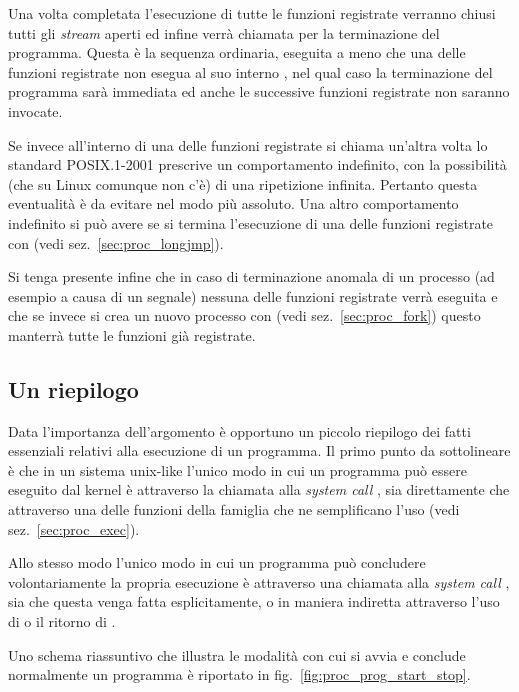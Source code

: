 Una volta completata l'esecuzione di tutte le funzioni registrate verranno
chiusi tutti gli \textit{stream} aperti ed infine verrà chiamata 
per la terminazione del programma. Questa è la sequenza ordinaria, eseguita a
meno che una delle funzioni registrate non esegua al suo interno
, nel qual caso la terminazione del programma sarà immediata ed
anche le successive funzioni registrate non saranno invocate.

Se invece all'interno di una delle funzioni registrate si chiama un'altra
volta  lo standard POSIX.1-2001 prescrive un comportamento
indefinito, con la possibilità (che su Linux comunque non c'è) di una
ripetizione infinita. Pertanto questa eventualità è da evitare nel modo più
assoluto. Una altro comportamento indefinito si può avere se si termina
l'esecuzione di una delle funzioni registrate con  (vedi
sez.~\ref{sec:proc_longjmp}).

Si tenga presente infine che in caso di terminazione anomala di un processo
(ad esempio a causa di un segnale) nessuna delle funzioni registrate verrà
eseguita e che se invece si crea un nuovo processo con  (vedi
sez.~\ref{sec:proc_fork}) questo manterrà tutte le funzioni già registrate.


\subsection{Un riepilogo}
\label{sec:proc_term_conclusion}

Data l'importanza dell'argomento è opportuno un piccolo riepilogo dei fatti
essenziali relativi alla esecuzione di un programma. Il primo punto da
sottolineare è che in un sistema unix-like l'unico modo in cui un programma
può essere eseguito dal kernel è attraverso la chiamata alla \textit{system
  call} , sia direttamente che attraverso una delle funzioni
della famiglia  che ne semplificano l'uso (vedi
sez.~\ref{sec:proc_exec}).

Allo stesso modo l'unico modo in cui un programma può concludere
volontariamente la propria esecuzione è attraverso una chiamata alla
\textit{system call} , sia che questa venga fatta esplicitamente,
o in maniera indiretta attraverso l'uso di  o il ritorno di
. 

Uno schema riassuntivo che illustra le modalità con cui si avvia e conclude
normalmente un programma è riportato in fig.~\ref{fig:proc_prog_start_stop}.

